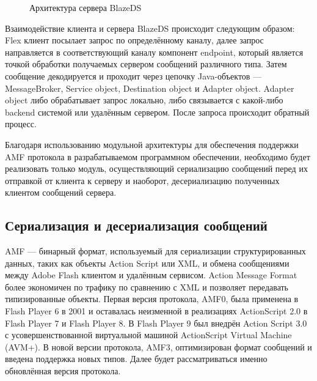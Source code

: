 \begin{figure}[ht]
\caption{Архитектура сервера BlazeDS}
\label{ris:blazeDSServer.png}
\end{figure}

Взаимодействие клиента и сервера BlazeDS происходит следующим образом:
Flex клиент посылает запрос по определённому каналу, далее запрос направляется в соответствующий каналу
компонент endpoint, который является точкой обработки получаемых сервером сообщений различного типа. Затем сообщение
декодируется и проходит через цепочку Java-объектов --- MessageBroker, Service object, Destination object и Adapter object.
Adapter object либо обрабатывает запрос локально, либо связывается с какой-либо backend системой или
удалённым сервером. После запроса происходит обратный процесс.
 
Благодаря использованию модульной архитектуры для обеспечения поддержки AMF протокола в разрабатываемом
программном обеспечении, необходимо будет реализовать только модуль, осуществляющий сериализацию сообщений
перед их отправкой от клиента к серверу и наоборот, десериализацию полученных клиентом сообщений 
сервера.

\subsection{Сериализация и десериализация сообщений}

AMF --- бинарный формат, используемый для сериализации структурированных данных, таких как объекты Action Script или
XML, и обмена сообщениями между Adobe Flash клиентом и удалённым сервисом\cite{amf}. Action Message Format более экономичен
по трафику по сравнению с XML и позволяет передавать типизированные объекты. Первая версия протокола, AMF0, была 
применена в Flash Player 6 в 2001 и оставалась неизменной в реализациях ActionScript 2.0 в Flash Player 7 и Flash 
Player 8. В Flash Player 9 был внедрён Action Script 3.0 с усовершенствованной виртуальной машиной 
ActionScript Virtual Machine (AVM+). В новой версии протокола, AMF3, оптимизирован формат сообщений и введена 
поддержка новых типов. Далее будет рассматриваться именно обновлённая версия протокола.

